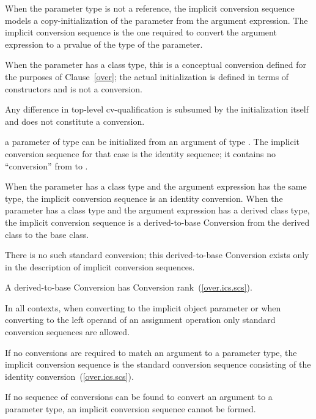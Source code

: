 \pnum
When the parameter type is not a reference, the implicit conversion
sequence models a copy-initialization of the parameter from the argument
expression.
The implicit conversion sequence is the one required to convert the
argument expression to a prvalue of the type of
the parameter.
\begin{note}
When the parameter has a class type, this is a conceptual conversion
defined for the purposes of Clause~\ref{over}; the actual initialization is
defined in terms of constructors and is not a conversion.
\end{note}
Any difference in top-level cv-qualification is
subsumed by the initialization itself and does not constitute a conversion.
\begin{example}
a parameter of type
can be initialized from an argument of type
.
The implicit conversion sequence for that case is the identity sequence; it
contains no ``conversion'' from
to
.
\end{example}
When the parameter has a class type and the argument expression has the
same type, the implicit conversion sequence is an identity conversion.
When the parameter has a class type and the argument expression has a
derived class type, the implicit conversion sequence is a
derived-to-base
%
Conversion from the derived class to the base class.
\begin{note}
There is no such standard conversion; this derived-to-base Conversion exists
only in the description of implicit conversion sequences.
\end{note}
A derived-to-base Conversion has Conversion rank~(\ref{over.ics.scs}).

\pnum
In all contexts, when converting to the implicit object parameter
or when converting to the left operand of an assignment operation
only standard conversion sequences are allowed.

\pnum
If no conversions are required to match an argument to a
parameter type, the implicit conversion sequence is the standard
conversion sequence consisting of the identity conversion~(\ref{over.ics.scs}).

\pnum
If no sequence of conversions can be found to convert an argument
to a parameter type, an implicit conversion sequence cannot be formed.

